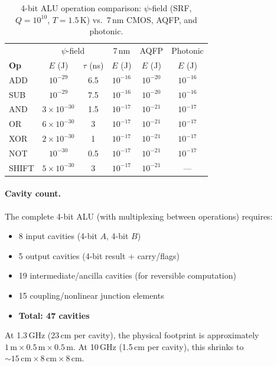 \documentclass[11pt,twocolumn]{article}
\theoremstyle{definition}
\theoremstyle{remark}
\begin{document}
\begin{table}[h]
\centering
\caption{4-bit ALU operation comparison: $\psi$-field (SRF, $Q =
10^{10}$, $T = 1.5\,\mathrm{K}$) vs.\ 7\,nm CMOS, AQFP, and photonic.}
\label{tab:alu_comparison}
\begin{tabular}{@{}lccccc@{}}
\toprule
 & \multicolumn{2}{c}{$\psi$-field} & \multicolumn{1}{c}{7\,nm} & \multicolumn{1}{c}{AQFP} & \multicolumn{1}{c}{Photonic} \\
\textbf{Op} & $E$ (J) & $\tau$ (ns) & $E$ (J) & $E$ (J) & $E$ (J) \\
\midrule
ADD & $10^{-29}$ & 6.5 & $10^{-16}$ & $10^{-20}$ & $10^{-16}$ \\
SUB & $10^{-29}$ & 7.5 & $10^{-16}$ & $10^{-20}$ & $10^{-16}$ \\
AND & $3\times 10^{-30}$ & 1.5 & $10^{-17}$ & $10^{-21}$ & $10^{-17}$ \\
OR & $6\times 10^{-30}$ & 3 & $10^{-17}$ & $10^{-21}$ & $10^{-17}$ \\
XOR & $2\times 10^{-30}$ & 1 & $10^{-17}$ & $10^{-21}$ & $10^{-17}$ \\
NOT & $10^{-30}$ & 0.5 & $10^{-17}$ & $10^{-21}$ & $10^{-17}$ \\
SHIFT & $5\times 10^{-30}$ & 3 & $10^{-17}$ & $10^{-21}$ & --- \\
\bottomrule
\end{tabular}
\end{table}

\paragraph{Cavity count.}
The complete 4-bit ALU (with multiplexing between operations) requires:
\begin{itemize}
\item 8 input cavities (4-bit $A$, 4-bit $B$)
\item 5 output cavities (4-bit result + carry/flags)
\item 19 intermediate/ancilla cavities (for reversible computation)
\item 15 coupling/nonlinear junction elements
\item \textbf{Total: 47 cavities}
\end{itemize}

At 1.3\,GHz (23\,cm per cavity), the physical footprint is approximately
$1\,\mathrm{m} \times 0.5\,\mathrm{m} \times 0.5\,\mathrm{m}$. At
10\,GHz (1.5\,cm per cavity), this shrinks to $\sim 15\,\mathrm{cm}
\times 8\,\mathrm{cm} \times 8\,\mathrm{cm}$.
\end{document}
